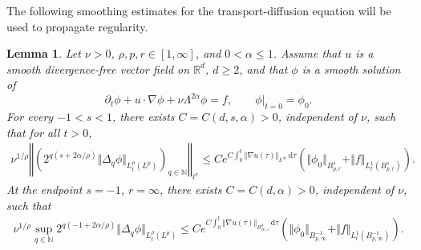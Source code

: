 \documentclass[reqno,11pt,a4paper]{amsart}
\newtheorem{lemma}[theorem]{Lemma}
\newcommand{\R}{\ensuremath{\mathbb{R}}}
\newcommand{\dd}{\mathrm{d}}
\begin{document}
The following smoothing estimates for the transport-diffusion
equation will be used to propagate regularity.
\begin{lemma}\label{lem:TD-sm}
Let $\nu>0$, $\rho,p,r\in[1,\infty]$, and $0<\alpha\leq1$.
Assume that $u$ is a smooth divergence-free vector field
on $\R^d$, $d\geq2$, and that $\phi$ is a smooth solution of
\begin{equation}\label{eq:TD}
  \partial_t\phi+u\cdot\nabla\phi+\nu\Lambda^{2\alpha}\phi=f,
  \qquad
  \phi|_{t=0}=\phi_0.
\end{equation}
For every $-1<s<1$, there exists
$C=C(d,s,\alpha)>0$, independent of $\nu$, such that
for all $t>0$,
\begin{equation}\label{eq:TD-sm4}
\begin{aligned}
  \nu^{1/\rho}
  \left\Vert 
    \left(
      2^{q(s+2\alpha/\rho)}
      \Vert \Delta_q\phi\Vert _{L^\rho_t(L^p)}
    \right)_{q\in\mathbb N}
  \right\Vert _{\ell^r}
  \leq
  Ce^{C\int_0^t\Vert \nabla u(\tau)\Vert _{L^\infty}\,\dd\tau}
  \left(
    \Vert \phi_0\Vert _{B^s_{p,r}}
    +\Vert f\Vert _{L^1_t(B^s_{p,r})}
  \right).
\end{aligned}
\end{equation}
At the endpoint $s=-1$, $r=\infty$,
there exists $C=C(d,\alpha)>0$, independent of $\nu$,
such that
\begin{equation}\label{eq:TD-sm5}
\begin{aligned}
  \nu^{1/\rho}
  \sup_{q\in\mathbb N}
  2^{q(-1+2\alpha/\rho)}
  \Vert \Delta_q\phi\Vert _{L^\rho_t(L^p)}
  \leq
  Ce^{C\int_0^t
    \Vert \nabla u(\tau)\Vert _{B^0_{\infty,1}}\,\dd\tau}
  \left(
    \Vert \phi_0\Vert _{B^{-1}_{p,\infty}}
    +\Vert f\Vert _{L^1_t(B^{-1}_{p,\infty})}
  \right).
\end{aligned}
\end{equation}
\end{lemma}
\end{document}
